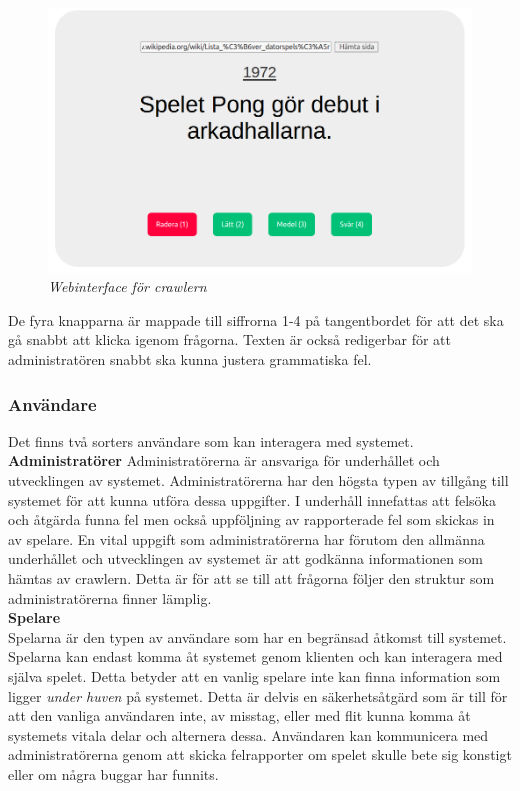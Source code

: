 \documentclass[a4paper, 11pt]{article}
\begin{document}
\begin{figure}[H]
	\begin{centering}
	\includegraphics[width=\textwidth]{crawler} 
	\end{centering}
	\caption{\textit{Webinterface för crawlern}}
\end{figure}

De fyra knapparna är mappade till siffrorna 1-4 på tangentbordet för att det ska gå snabbt att klicka igenom frågorna. Texten är också redigerbar för att administratören snabbt ska kunna justera grammatiska fel.

\subsubsection{Användare}
Det finns två sorters användare som kan interagera med systemet.\\
\newline
\textbf{Administratörer} \label{admins}
Administratörerna är ansvariga för underhållet och utvecklingen av systemet. Administratörerna har den högsta typen av tillgång till systemet för att kunna utföra dessa uppgifter. I underhåll innefattas att felsöka och åtgärda funna fel men också uppföljning av rapporterade fel som skickas in av spelare. En vital uppgift som administratörerna har förutom den allmänna underhållet och utvecklingen av systemet är att godkänna informationen som hämtas av crawlern. Detta är för att se till att frågorna följer den struktur som administratörerna finner lämplig.\\
\newline
\textbf{Spelare}\\
Spelarna är den typen av användare som har en begränsad åtkomst till systemet. Spelarna kan endast komma åt systemet genom klienten och kan interagera med själva spelet. Detta betyder att en vanlig spelare inte kan finna information som ligger \textit{under huven} på systemet. Detta är delvis en säkerhetsåtgärd som är till för att den vanliga användaren inte, av misstag, eller med flit kunna komma åt systemets vitala delar och alternera dessa. Användaren kan kommunicera med administratörerna genom att skicka felrapporter om spelet skulle bete sig konstigt eller om några buggar har funnits.
\end{document}
